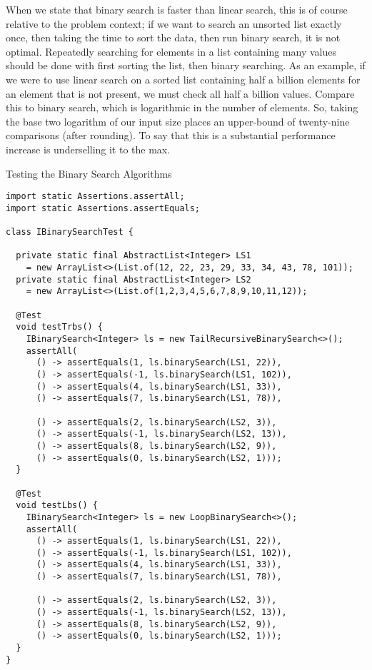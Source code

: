 When we state that binary search is faster than linear search, this is of course relative to the problem context; if we want to search an unsorted list exactly once, then taking the time to sort the data, then run binary search, it is not optimal. Repeatedly searching for elements in a list containing many values should be done with first sorting the list, then binary searching. As an example, if we were to use linear search on a sorted list containing half a billion elements for an element that is not present, we must check all half a billion values. Compare this to binary search, which is logarithmic in the number of elements. So, taking the base two logarithm of our input size places an upper-bound of twenty-nine comparisons (after rounding). To say that this is a substantial performance increase is underselling it to the max.

\begin{cl}[]{Testing the Binary Search Algorithms}
\begin{lstlisting}[language=MyJava]
import static Assertions.assertAll;
import static Assertions.assertEquals;

class IBinarySearchTest {
  
  private static final AbstractList<Integer> LS1 
    = new ArrayList<>(List.of(12, 22, 23, 29, 33, 34, 43, 78, 101));
  private static final AbstractList<Integer> LS2 
    = new ArrayList<>(List.of(1,2,3,4,5,6,7,8,9,10,11,12));

  @Test
  void testTrbs() {
    IBinarySearch<Integer> ls = new TailRecursiveBinarySearch<>();
    assertAll(
      () -> assertEquals(1, ls.binarySearch(LS1, 22)),
      () -> assertEquals(-1, ls.binarySearch(LS1, 102)),
      () -> assertEquals(4, ls.binarySearch(LS1, 33)),
      () -> assertEquals(7, ls.binarySearch(LS1, 78)),

      () -> assertEquals(2, ls.binarySearch(LS2, 3)),
      () -> assertEquals(-1, ls.binarySearch(LS2, 13)),
      () -> assertEquals(8, ls.binarySearch(LS2, 9)),
      () -> assertEquals(0, ls.binarySearch(LS2, 1)));
  }
  
  @Test
  void testLbs() {
    IBinarySearch<Integer> ls = new LoopBinarySearch<>();
    assertAll(
      () -> assertEquals(1, ls.binarySearch(LS1, 22)),
      () -> assertEquals(-1, ls.binarySearch(LS1, 102)),
      () -> assertEquals(4, ls.binarySearch(LS1, 33)),
      () -> assertEquals(7, ls.binarySearch(LS1, 78)),

      () -> assertEquals(2, ls.binarySearch(LS2, 3)),
      () -> assertEquals(-1, ls.binarySearch(LS2, 13)),
      () -> assertEquals(8, ls.binarySearch(LS2, 9)),
      () -> assertEquals(0, ls.binarySearch(LS2, 1)));
  }
}
\end{lstlisting}
\end{cl}


